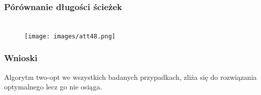\documentclass[11pt]{article}
\begin{document}
\subsubsection{Pórównanie długości ścieżek}
            \begin{center}
            \begin{figure}[H]
                \\ \texttt{[image: images/att48.png]}\
            \end{figure}
            \end{center}
\subsubsection{Wnioski}
Algorytm two-opt we wszystkich badanych przypadkach, zliża się do rozwiązania optymalnego lecz go nie osiąga.
\end{document}
